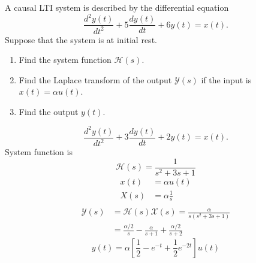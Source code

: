 \begin{frame}
    \begin{example}
        A causal LTI system is described by the differential equation
        \begin{equation*}
            \frac{d^2y(t)}{dt^2} + 5\frac{dy(t)}{dt} + 6y(t) = x(t).
        \end{equation*}
        Suppose that the system is at initial rest.
        \begin{enumerate}
            \item Find the system function $\mathcal{H}(s)$.
            \item Find the Laplace transform of the output $\mathcal{Y}(s)$ if the input is $x(t) = \alpha u(t)$.
            \item Find the output $y(t)$.
        \end{enumerate}
    \end{example}
\end{frame}





\begin{frame}
    {
        \begin{equation*}
            \frac{d^2y(t)}{dt^2} + 3\frac{dy(t)}{dt} + 2y(t) = x(t).
        \end{equation*} 
        System function is
        \begin{equation*}
            \mathcal{H}(s) = \frac{1}{s^2 + 3s + 1}
        \end{equation*} 
        \pause
        \begin{align*}
          x(t) &= \alpha u(t)\\
          X(s) &= \alpha \frac{1}{s}\\
        \end{align*}
        \pause
        \begin{equation*}
            \begin{split}
            \mathcal{Y}(s) &=  \mathcal{H}(s)\mathcal{X}(s) = \frac{\alpha}{s(s^2 + 3s + 1)}\\
            &= \frac{\alpha/2}{s} - \frac{\alpha}{s+1} +\frac{\alpha/2}{s+2}
            \end{split}
        \end{equation*}     
        \pause
        \begin{equation*}
            y(t) = \alpha \left[ \frac{1}{2} - e^{-t} + \frac{1}{2}e^{-2t}\right]u(t)
        \end{equation*}
                    
    }
\end{frame}

